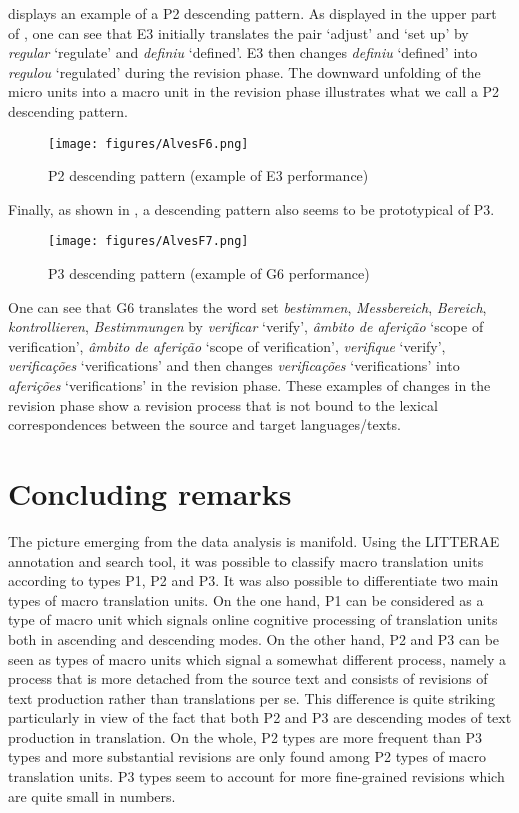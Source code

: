 \documentclass[output=paper]{LSP/langsci}
\begin{document}
 displays an example of a P2 descending pattern. As displayed in the upper part of , one can see that E3 initially translates the pair `adjust' and `set up'  by \textit{regular} `regulate' and \textit{definiu} `defined'. E3 then changes \textit{definiu} `defined' into \textit{regulou} `regulated' during the revision phase. The downward unfolding of the micro units into a macro unit in the revision phase illustrates what we call a P2 descending pattern.

\begin{figure}
\texttt{[image: figures/AlvesF6.png]}
\caption{P2 descending pattern (example of E3 performance)}
\label{fig:alves:6}
\end{figure} 

Finally, as shown in , a descending pattern also seems to be prototypical of P3.

\begin{figure}
\texttt{[image: figures/AlvesF7.png]}
\caption{P3 descending pattern (example of G6 performance)}
\label{fig:alves:7}
\end{figure} 

One can see that G6 translates the word set \textit{bestimmen}, \textit{Messbereich}, \textit{Bereich}, \textit{kontrollieren}, \textit{Bestimmungen} by \textit{verificar} `verify', \textit{âmbito de aferição} `scope of verification', \textit{âmbito de aferição} `scope of verification', \textit{verifique} `verify', \textit{verificações} `verifications' and then changes \textit{verificações} `verifications' into \textit{aferições} `verifications' in the revision phase. These examples of changes in the revision phase show a revision process that is not bound to the lexical correspondences between the source and target languages/texts.


\section{Concluding remarks}\label{sec:alves:5}

The picture emerging from the data analysis is manifold. Using the LITTERAE annotation and search tool, it was possible to classify macro translation units according to types P1, P2 and P3. It was also possible to differentiate two main types of macro translation units. On the one hand, P1 can be considered as a type of macro unit which signals online cognitive processing of translation units both in ascending and descending modes. On the other hand, P2 and P3 can be seen as types of macro units which signal a somewhat different process, namely a process that is more detached from the source text and consists of revisions of text production rather than translations per se. This difference is quite striking particularly in view of the fact that both P2 and P3 are descending modes of text production in translation. On the whole, P2 types are more frequent than P3 types and more substantial revisions are only found  among P2 types of macro translation units. P3 types seem to account for more fine-grained revisions which are quite small in numbers.
\end{document}
